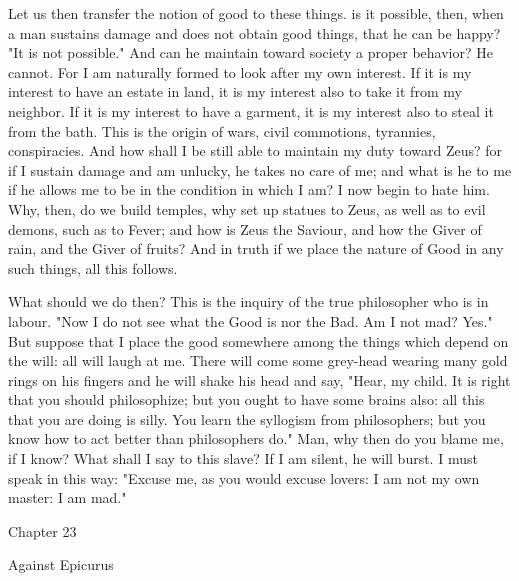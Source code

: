\documentclass[a4paper]{article}
\begin{document}
Let us then transfer the notion of good to these things. is it possible,
then, when a man sustains damage and does not obtain good things,
that he can be happy? "It is not possible." And can he maintain toward
society a proper behavior? He cannot. For I am naturally formed to
look after my own interest. If it is my interest to have an estate
in land, it is my interest also to take it from my neighbor. If it
is my interest to have a garment, it is my interest also to steal
it from the bath. This is the origin of wars, civil commotions, tyrannies,
conspiracies. And how shall I be still able to maintain my duty toward
Zeus? for if I sustain damage and am unlucky, he takes no care of
me; and what is he to me if he allows me to be in the condition in
which I am? I now begin to hate him. Why, then, do we build temples,
why set up statues to Zeus, as well as to evil demons, such as to
Fever; and how is Zeus the Saviour, and how the Giver of rain, and
the Giver of fruits? And in truth if we place the nature of Good in
any such things, all this follows. 

What should we do then? This is the inquiry of the true philosopher
who is in labour. "Now I do not see what the Good is nor the Bad.
Am I not mad? Yes." But suppose that I place the good somewhere among
the things which depend on the will: all will laugh at me. There will
come some grey-head wearing many gold rings on his fingers and he
will shake his head and say, "Hear, my child. It is right that you
should philosophize; but you ought to have some brains also: all this
that you are doing is silly. You learn the syllogism from philosophers;
but you know how to act better than philosophers do." Man, why then
do you blame me, if I know? What shall I say to this slave? If I am
silent, he will burst. I must speak in this way: "Excuse me, as you
would excuse lovers: I am not my own master: I am mad." 

Chapter 23

Against Epicurus
\end{document}
